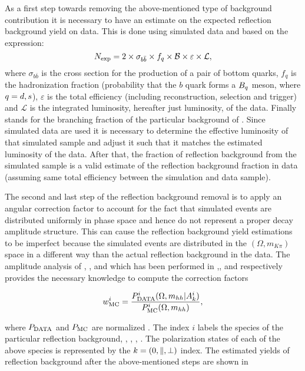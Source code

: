 As a first step towards removing the above-mentioned type of background contribution it is necessary to have an estimate
on the expected reflection background yield on data. This is done using simulated data and based on the expression:
\begin{equation}
N_{\rm exp} = 2 \times \sigma_{b\bar{b}}\times f_q \times {\ensuremath{\cal B}} \times \varepsilon \times {\mathcal{L}},
\end{equation}
\noindent where $\sigma_{b\bar{b}}$ is the cross section for the production of a pair of bottom quarks, $f_q$ is the hadronization fraction
(probability that the $b$ quark forms a $B_q$ meson, where $q=d,s$), $\varepsilon$ is the total efficiency (including reconstruction,
selection and trigger) and ${\mathcal{L}}$ is the integrated luminosity, hereafter just luminosity, of the data. Finally \BF stands for the
branching fraction of the particular background of . Since simulated data are used it is necessary to determine
the effective luminosity of that simulated sample and adjust it such that it matches the estimated luminosity of the data.
After that, the fraction of reflection background from the simulated sample is a valid estimate of the reflection background fraction
in data (assuming same total efficiency between the simulation and data sample).

The second and last step of the reflection background removal is to apply an angular correction factor to account for the fact that
simulated events are distributed uniformly in phase space and hence do not represent a proper decay amplitude structure.
This can cause the reflection background yield estimations to be imperfect because the simulated events are distributed in the $(\Omega, m_{K\pi})$ space
in a different way than the actual reflection background in the data. The amplitude analysis of \BdJpsipipi, \BsJpsipipi, \BsJpsiKK and \LbJpsipK
which has been performed in \cite{SheldonBdpipi},\cite{SheldonBspipi},\cite{SheldonKK} and \cite{Gao:1701984} respectively provides
the necessary knowledge to compute the correction factors

\begin{equation}
\centering
w_{\rm MC}^i = \frac{P_{\rm DATA}^i (\Omega, m_{hh}  | A_k^i)} {P_{\rm MC}^i(\Omega, m_{hh})},
\end{equation}

\noindent where $P_{\rm DATA}$ and $P_{\rm MC}$ are normalized \pdfs.
The index $i$ labels the species of the particular reflection background, \ie \BdJpsipipi, \BsJpsipipi, \BsJpsiKK, \LbJpsipK.
The polarization states of each of the above species is represented by the $k=\left( 0, \parallel, \perp \right)$ index.
The estimated yields of reflection background after the above-mentioned steps are shown in 

